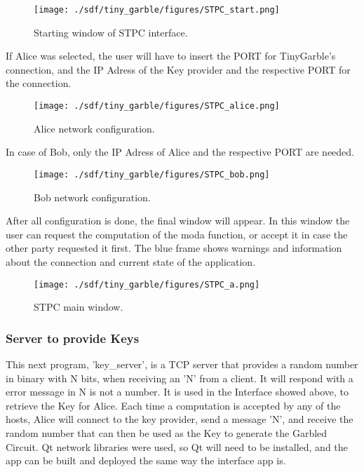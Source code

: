 \begin{refsection}
\begin{figure}[H]
	\centering
	\texttt{[image: ./sdf/tiny\_garble/figures/STPC\_start.png]}
    \caption{Starting window of STPC interface.}\label{fig:STPC_start}
\end{figure}

If Alice was selected, the user will have to insert the PORT for TinyGarble's connection, and the IP Adress of the Key provider and the respective PORT for the connection.


\begin{figure}[H]
	\centering
	\texttt{[image: ./sdf/tiny\_garble/figures/STPC\_alice.png]}
    \caption{Alice network configuration.}\label{fig:STPC_alice}
\end{figure}

In case of Bob, only the IP Adress of Alice and the respective PORT are needed.


\begin{figure}[H]
	\centering
	\texttt{[image: ./sdf/tiny\_garble/figures/STPC\_bob.png]}
    \caption{Bob network configuration.}\label{fig:STPC_bob}
\end{figure}

After all configuration is done, the final window will appear. In this window the user can request the computation of the moda function, or accept it in case the other party requested it first.
The blue frame shows warnings and information about the connection and current state of the application.

\begin{figure}[H]
	\centering
	\texttt{[image: ./sdf/tiny\_garble/figures/STPC\_a.png]}
    \caption{STPC main window.}\label{fig:STPC_a}
\end{figure}

\subsubsection{Server to provide Keys}

This next program, 'key\_server', is a TCP server that provides a random number in binary with N bits, when receiving an 'N' from a client. It will respond with a error message in N is not a number.
It is used in the Interface showed above, to retrieve the Key for Alice. Each time a computation is accepted by any of the hosts, Alice will connect to the key provider, send a message 'N', and receive the random number that can then be used as the Key to generate the Garbled Circuit.
Qt network libraries were used, so Qt will need to be installed, and the app can be built and deployed the same way the interface app is.


\end{refsection}
